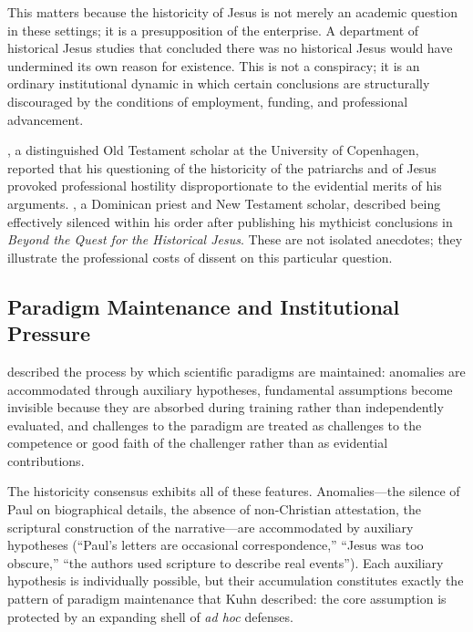 \documentclass[12pt,oneside]{article}
\begin{document}
This matters because the historicity of Jesus is not merely an academic
question in these settings; it is a presupposition of the enterprise.
A department of historical Jesus studies that concluded there was no
historical Jesus would have undermined its own reason for existence.
This is not a conspiracy; it is an ordinary institutional dynamic in
which certain conclusions are structurally discouraged by the conditions
of employment, funding, and professional advancement.

\citet{Thompson2005}, a distinguished Old Testament scholar at the
University of Copenhagen, reported that his questioning of the
historicity of the patriarchs and of Jesus provoked professional
hostility disproportionate to the evidential merits of his arguments.
\citet{Brodie2012}, a Dominican priest and New Testament scholar,
described being effectively silenced within his order after publishing
his mythicist conclusions in \textit{Beyond the Quest for the Historical
Jesus}.  These are not isolated anecdotes; they illustrate the
professional costs of dissent on this particular question.

\subsection{Paradigm Maintenance and Institutional Pressure}
\label{sec:sociology:paradigm}

\citet{Kuhn1962} described the process by which scientific paradigms
are maintained: anomalies are accommodated through auxiliary hypotheses,
fundamental assumptions become invisible because they are absorbed
during training rather than independently evaluated, and challenges to
the paradigm are treated as challenges to the competence or good faith
of the challenger rather than as evidential contributions.

The historicity consensus exhibits all of these features.  Anomalies---the
silence of Paul on biographical details, the absence of non-Christian
attestation, the scriptural construction of the narrative---are
accommodated by auxiliary hypotheses (``Paul's letters are occasional
correspondence,'' ``Jesus was too obscure,'' ``the authors used
scripture to describe real events'').  Each auxiliary hypothesis is
individually possible, but their accumulation constitutes exactly the
pattern of paradigm maintenance that Kuhn described: the core
assumption is protected by an expanding shell of \textit{ad hoc}
defenses.
\end{document}
